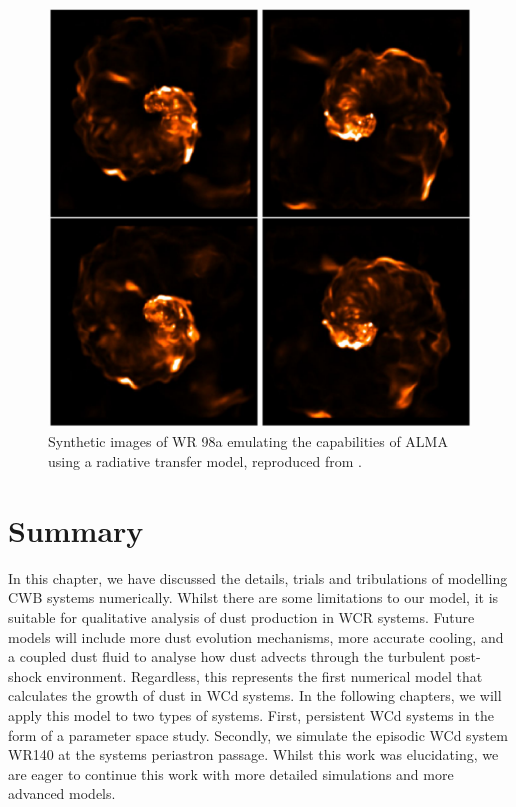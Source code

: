 \begin{figure}[ht]
  \centering
  \includegraphics{assets/hendrix-synthetic-observation.jpeg}
  \caption[\textit{Radiative transfer images of WR98a \parencite{hendrix_pinwheels_2016}}]{Synthetic images of WR 98a emulating the capabilities of ALMA using a radiative transfer model, reproduced from \textcite{hendrix_pinwheels_2016}.}
  \label{fig:hendrix-synthetic}
\end{figure}

\section{Summary}

In this chapter, we have discussed the details, trials and tribulations of modelling CWB systems numerically.
Whilst there are some limitations to our model, it is suitable for qualitative analysis of dust production in WCR systems.
Future models will include more dust evolution mechanisms, more accurate cooling, and a coupled dust fluid to analyse how dust advects through the turbulent post-shock environment.
Regardless, this represents the first numerical model that calculates the growth of dust in WCd systems.
In the following chapters, we will apply this model to two types of systems.
First, persistent WCd systems in the form of a parameter space study.
Secondly, we simulate the episodic WCd system WR140 at the systems periastron passage.
Whilst this work was elucidating, we are eager to continue this work with more detailed simulations and more advanced models.